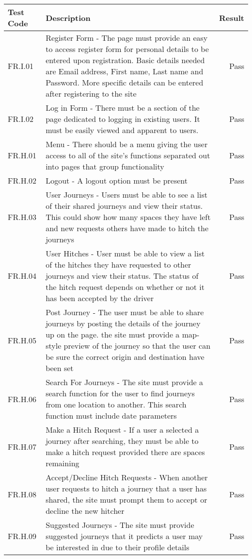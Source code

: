 \begin{tabular}{| l | p{9cm} | r |}
\hline
Test Code & Description & Result \\
\hline
FR.I.01 & Register Form - The page must provide an easy to access register form for personal details to be entered upon registration. Basic details needed are Email address, First name, Last name and Password. More specific details can be entered after registering to the site & Pass \\
\hline
FR.I.02 & Log in Form - There must be a section of the page dedicated to logging in existing users. It must be easily viewed and apparent to users. & Pass \\
\hline
FR.H.01 & Menu - There should be a menu giving the user access to all of the site's functions separated out into pages that group functionality & Pass \\
\hline
FR.H.02 & Logout - A logout option must be present & Pass \\
\hline
FR.H.03 & User Journeys - Users must be able to see a list of their shared journeys and view their status. This could show how many spaces they have left and new requests others have made to hitch the journeys & Pass \\
\hline
FR.H.04 & User Hitches - User must be able to view a list of the hitches they have requested to other journeys and view their status. The status of the hitch request depends on whether or not it has been accepted by the driver & Pass \\
\hline
FR.H.05 & Post Journey - The user must be able to share journeys by posting the details of the journey up on the page. the site must provide a map-style preview of the journey so that the user can be sure the correct origin and destination have been set & Pass \\
\hline
FR.H.06 &Search For Journeys - The site must provide a search function for the user to find journeys from one location to another. This search function must include date parameters & Pass \\
\hline
FR.H.07 & Make a Hitch Request - If a user a selected a journey after searching, they must be able to make a hitch request provided there are spaces remaining & Pass \\
\hline
FR.H.08 &  Accept/Decline Hitch Requests - When another user requests to hitch a journey that a user has shared, the site must prompt them to accept or decline the new hitcher & Pass \\
\hline
FR.H.09 & Suggested Journeys - The site must provide suggested journeys that it predicts a user may be interested in due to their profile details & Pass \\

\end{tabular}
